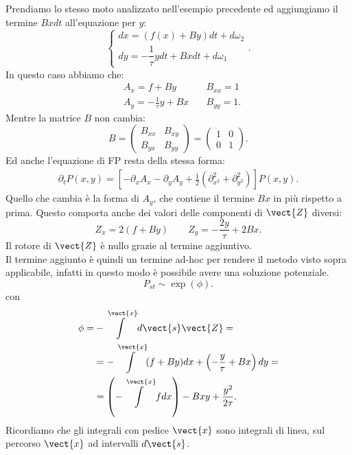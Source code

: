 \begin{exmp}[OU modificato]
Prendiamo lo stesso moto analizzato nell'esempio precedente ed aggiungiamo il termine $Bxdt$ all'equazione per $y$:
    \[
        \begin{cases}
	    dx = \left(f(x) + By\right)dt + d\omega_2\\
	    dy = -\dfrac{1}{\tau} y dt + Bxdt + d\omega_1
        \end{cases}
    .\] 
In questo caso abbiamo che:
\[\begin{aligned}
	&A_x = f+By & \quad B_{xx} = 1\\
	&A_y = -\frac{1}{\tau}y + Bx &\quad B_{yy}=1
.\end{aligned}\]
Mentre la matrice $B$ non cambia:
    \[
        B = 
	\begin{pmatrix}
	    B_{xx} & B_{xy}\\
	    B_{yx} & B_{yy}
	\end{pmatrix}
	=
	\begin{pmatrix}
	    1 & 0\\
	    0 & 1
        \end{pmatrix}
    .\] 
    Ed anche l'equazione di FP resta della stessa forma:
    \[\begin{aligned}
	\partial_{t}P(x,y) = \left[-\partial_{x}A_x - \partial_{y}A_y + \frac{1}{2}(\partial^2_{x^2}+\partial^2_{y^2}) \right]P(x,y) 
    .\end{aligned}\]
    Quello che cambia è la forma di $A_y$, che contiene il termine $Bx$ in più rispetto a prima. Questo comporta anche dei valori delle componenti di $\vect{Z}$ diversi:
    \[
	Z_x = 2(f+By) \qquad Z_y = -\frac{2y}{\tau}+2Bx
    .\] 
    Il rotore di $\vect{Z}$ è nullo grazie al termine aggiuntivo.\\
    Il termine aggiunto è quindi un termine ad-hoc per rendere il metodo visto sopra applicabile, infatti in questo modo è possibile avere una soluzione potenziale.
    \[
        P_{st}\sim \exp(\phi )
    .\] 
    con 
    \[\begin{aligned}
	\phi =& - \int\limits^{\vect{x}} d\vect{s}\vect{Z}  = \\
	      &= - \int\limits^{\vect{x}} (f+By)dx + \left(-\frac{y}{\tau} + Bx\right)dy = \\
	      &= \left(-\int\limits^{\vect{x}} fdx \right)-Bxy + \frac{y^2}{2\tau}
    .\end{aligned}\]
    Ricordiamo che gli integrali con pedice $\vect{x}$ sono integrali di linea, sul percorso $\vect{x}$ ad intervalli $d\vect{s}$.\\

\end{exmp}
